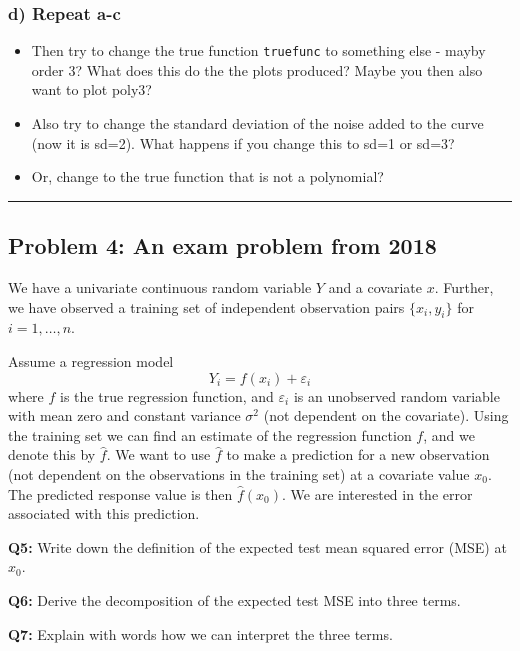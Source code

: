 \documentclass[]{article}
\providecommand{\tightlist}{%
  \setlength{\itemsep}{0pt}\setlength{\parskip}{0pt}}
\begin{document}
\subsubsection{d) Repeat a-c}\label{d-repeat-a-c}

\begin{itemize}
\tightlist
\item
  Then try to change the true function \texttt{truefunc} to something
  else - mayby order 3? What does this do the the plots produced? Maybe
  you then also want to plot poly3?
\item
  Also try to change the standard deviation of the noise added to the
  curve (now it is sd=2). What happens if you change this to sd=1 or
  sd=3?
\item
  Or, change to the true function that is not a polynomial?
\end{itemize}

\begin{center}\rule{0.5\linewidth}{\linethickness}\end{center}

\subsection{Problem 4: An exam problem from
2018}\label{problem-4-an-exam-problem-from-2018}

We have a univariate continuous random variable \(Y\) and a covariate
\(x\). Further, we have observed a training set of independent
observation pairs \(\{x_i, y_i\}\) for \(i=1,\ldots,n\).

Assume a regression model \[Y_i  = f(x_i) + \varepsilon_i\] where \(f\)
is the true regression function, and \(\varepsilon_i\) is an unobserved
random variable with mean zero and constant variance \(\sigma^2\) (not
dependent on the covariate). Using the training set we can find an
estimate of the regression function \(f\), and we denote this by
\(\hat{f}\). We want to use \(\hat{f}\) to make a prediction for a new
observation (not dependent on the observations in the training set) at a
covariate value \(x_0\). The predicted response value is then
\(\hat{f}(x_0)\). We are interested in the error associated with this
prediction.

\textbf{Q5:} Write down the definition of the expected test mean squared
error (MSE) at \(x_0\).

\textbf{Q6:} Derive the decomposition of the expected test MSE into
three terms.

\textbf{Q7:} Explain with words how we can interpret the three terms.
\end{document}

